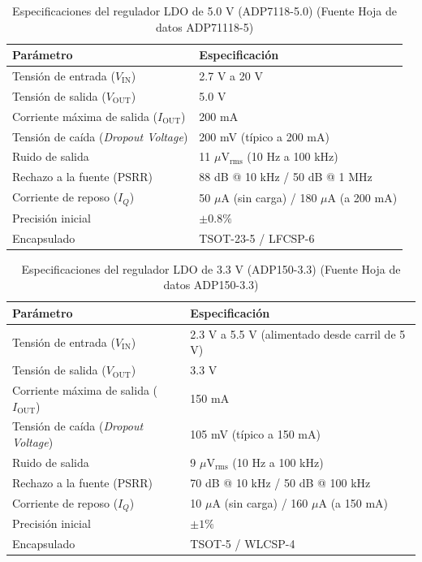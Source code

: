 \documentclass[11pt,a4paper,twoside]{report}
\begin{document}
	\begin{table}[htbp]
		\centering
		\label{tab:specs_adp7118_5v}
		\begin{tabular}{ll}
			\hline
			\textbf{Parámetro} & \textbf{Especificación} \\ \hline
			Tensión de entrada ($V_{\mathrm{IN}}$) & 2.7 V a 20 V \\
			Tensión de salida ($V_{\mathrm{OUT}}$) & 5.0 V \\
			Corriente máxima de salida ($I_{\mathrm{OUT}}$) & 200 mA \\
			Tensión de caída (\textit{Dropout Voltage}) & 200 mV (típico a 200 mA) \\
			Ruido de salida & 11 $\mu\mathrm{V_{rms}}$ (10 Hz a 100 kHz) \\
			Rechazo a la fuente (PSRR) & 88 dB @ 10 kHz / 50 dB @ 1 MHz \\
			Corriente de reposo ($I_Q$) & 50 $\mu\mathrm{A}$ (sin carga) / 180 $\mu\mathrm{A}$ (a 200 mA) \\
			Precisión inicial & $\pm 0.8\%$ \\
			Encapsulado & TSOT-23-5 / LFCSP-6 \\ \hline
		\end{tabular}
		\caption{Especificaciones del regulador LDO de 5.0 V (ADP7118-5.0) (Fuente Hoja de datos ADP71118-5)}
		\end{table}
			
	\begin{table}[htbp]
		\centering
		\label{tab:specs_adp150_3v3}
		\begin{tabular}{ll}
			\hline
			\textbf{Parámetro} & \textbf{Especificación} \\ \hline
			Tensión de entrada ($V_{\mathrm{IN}}$) & 2.3 V a 5.5 V (alimentado desde carril de 5 V) \\
			Tensión de salida ($V_{\mathrm{OUT}}$) & 3.3 V \\
			Corriente máxima de salida ($I_{\mathrm{OUT}}$) & 150 mA \\
			Tensión de caída (\textit{Dropout Voltage}) & 105 mV (típico a 150 mA) \\
			Ruido de salida & 9 $\mu\mathrm{V_{rms}}$ (10 Hz a 100 kHz) \\
			Rechazo a la fuente (PSRR) & 70 dB @ 10 kHz / 50 dB @ 100 kHz \\
			Corriente de reposo ($I_Q$) & 10 $\mu\mathrm{A}$ (sin carga) / 160 $\mu\mathrm{A}$ (a 150 mA) \\
			Precisión inicial & $\pm 1\%$ \\
			Encapsulado & TSOT-5 / WLCSP-4 \\ \hline
		\end{tabular}
		\caption{Especificaciones del regulador LDO de 3.3 V (ADP150-3.3) (Fuente Hoja de datos ADP150-3.3)}
	\end{table}
	
\end{document}

